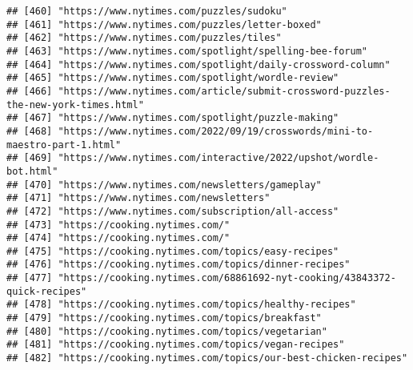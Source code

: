 \documentclass[
]{article}
\begin{document}
\begin{verbatim}
## [460] "https://www.nytimes.com/puzzles/sudoku"                                                                    
## [461] "https://www.nytimes.com/puzzles/letter-boxed"                                                              
## [462] "https://www.nytimes.com/puzzles/tiles"                                                                     
## [463] "https://www.nytimes.com/spotlight/spelling-bee-forum"                                                      
## [464] "https://www.nytimes.com/spotlight/daily-crossword-column"                                                  
## [465] "https://www.nytimes.com/spotlight/wordle-review"                                                           
## [466] "https://www.nytimes.com/article/submit-crossword-puzzles-the-new-york-times.html"                          
## [467] "https://www.nytimes.com/spotlight/puzzle-making"                                                           
## [468] "https://www.nytimes.com/2022/09/19/crosswords/mini-to-maestro-part-1.html"                                 
## [469] "https://www.nytimes.com/interactive/2022/upshot/wordle-bot.html"                                           
## [470] "https://www.nytimes.com/newsletters/gameplay"                                                              
## [471] "https://www.nytimes.com/newsletters"                                                                       
## [472] "https://www.nytimes.com/subscription/all-access"                                                           
## [473] "https://cooking.nytimes.com/"                                                                              
## [474] "https://cooking.nytimes.com/"                                                                              
## [475] "https://cooking.nytimes.com/topics/easy-recipes"                                                           
## [476] "https://cooking.nytimes.com/topics/dinner-recipes"                                                         
## [477] "https://cooking.nytimes.com/68861692-nyt-cooking/43843372-quick-recipes"                                   
## [478] "https://cooking.nytimes.com/topics/healthy-recipes"                                                        
## [479] "https://cooking.nytimes.com/topics/breakfast"                                                              
## [480] "https://cooking.nytimes.com/topics/vegetarian"                                                             
## [481] "https://cooking.nytimes.com/topics/vegan-recipes"                                                          
## [482] "https://cooking.nytimes.com/topics/our-best-chicken-recipes"                                               

\end{verbatim}
\end{document}
